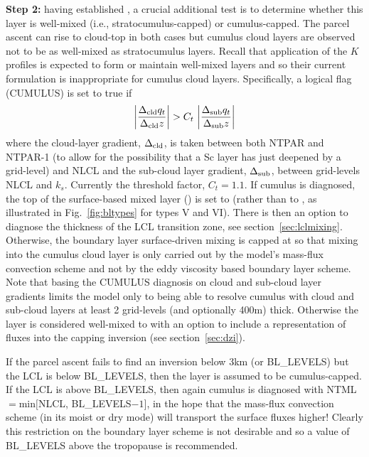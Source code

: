 \documentclass{UMDP_article}
\begin{document}
{\bf Step 2:} having established \zhpar, a crucial additional test is
to determine whether this layer is well-mixed (\mbox{i.e.},
stratocumulus-capped) or cumulus-capped.  The parcel ascent can rise
to cloud-top in both cases but cumulus cloud layers are observed not
to be as well-mixed as stratocumulus layers.  Recall that application
of the $K$ profiles is expected to form or maintain well-mixed layers
and so their current formulation is inappropriate for cumulus cloud
layers.  Specifically, a logical flag (CUMULUS) is set to true if
\begin{equation*}
         \left| \frac{ \Delta_{\rm cld} q_t}{\Delta_{\rm cld} z} \right| > 
  C_t \, \left| \frac{ \Delta_{\rm sub} q_t}{\Delta_{\rm sub} z} \right|
\end{equation*}
where the cloud-layer gradient, $ \Delta_{\rm cld} $, is taken between
both NTPAR and NTPAR-1 (to allow for the possibility that a Sc layer
has just deepened by a grid-level) and NLCL and the sub-cloud layer
gradient, $\Delta_{\rm sub}$, between grid-levels NLCL and $k_s$.
Currently the threshold factor, $C_t = 1.1$.  If cumulus is diagnosed,
the top of the surface-based mixed layer (\zh) is set to \zlcl (rather
than to \zhpar, as illustrated in Fig.~\ref{fig:bltypes} for types V
and VI).  There is then an option to diagnose the thickness of the LCL
transition zone, see section~\ref{sec:lclmixing}.  Otherwise, the
boundary layer surface-driven mixing is capped at \zlcl so that mixing
into the cumulus cloud layer is only carried out by the model's
mass-flux convection scheme and not by the eddy viscosity based
boundary layer scheme.  Note that basing the CUMULUS diagnosis on
cloud and sub-cloud layer gradients limits the model only to being
able to resolve cumulus with cloud and sub-cloud layers at least 2
grid-levels (and optionally 400m) thick.  Otherwise the layer is
considered well-mixed to \zhpar with an option to include a
representation of fluxes into the capping inversion (see
section~\ref{sec:dzi}).

If the parcel ascent fails to find an inversion below 3km (or
BL\_LEVELS) but the LCL is below BL\_LEVELS, then the layer is assumed
to be cumulus-capped.  If the LCL is above BL\_LEVELS, then again
cumulus is diagnosed with NTML$=\mbox{min}[$NLCL, BL\_LEVELS$-1]$, in
the hope that the mass-flux convection scheme (in its moist or dry
mode) will transport the surface fluxes higher! Clearly this
restriction on the boundary layer scheme is not desirable and so a
value of BL\_LEVELS above the tropopause is recommended.
\end{document}
